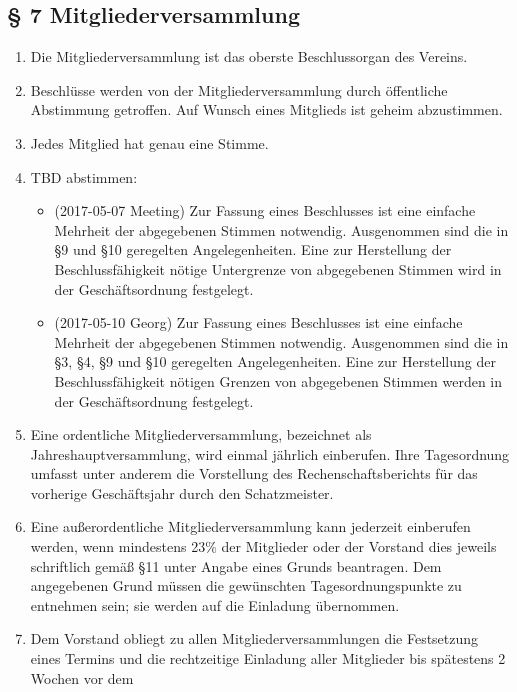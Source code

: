 ﻿\documentclass[10pt,a4paper]{scrartcl}
\begin{document}
\subsection*{§ 7 Mitgliederversammlung}
\begin{enumerate}

        \item Die Mitgliederversammlung ist das oberste Beschlussorgan des Vereins.
        \item Beschlüsse werden von der Mitgliederversammlung durch öffentliche Abstimmung getroffen.
                Auf Wunsch eines Mitglieds ist geheim abzustimmen.
        \item Jedes Mitglied hat genau eine Stimme.
		\item TBD abstimmen:
		    \begin{itemize}
				\item (2017-05-07 Meeting) Zur Fassung eines Beschlusses ist eine einfache Mehrheit der abgegebenen Stimmen
						notwendig. Ausgenommen sind die in §9 und §10 geregelten Angelegenheiten. Eine
						zur Herstellung der Beschlussfähigkeit nötige Untergrenze von abgegebenen Stimmen
						wird in der Geschäftsordnung festgelegt.
				\item (2017-05-10 Georg) Zur Fassung eines Beschlusses ist eine einfache Mehrheit der abgegebenen Stimmen
						notwendig. Ausgenommen sind die in §3, §4, §9 und §10 geregelten Angelegenheiten. Eine
						zur Herstellung der Beschlussfähigkeit nötigen Grenzen von abgegebenen Stimmen
						werden in der Geschäftsordnung festgelegt.
			\end{itemize}
        \item Eine ordentliche Mitgliederversammlung, bezeichnet als Jahreshauptversammlung,
                wird einmal jährlich einberufen. Ihre Tagesordnung umfasst unter anderem die
                Vorstellung des Rechenschaftsberichts für das vorherige Geschäftsjahr durch
                den Schatzmeister.
        \item Eine außerordentliche Mitgliederversammlung kann jederzeit einberufen werden, wenn
                mindestens 23\% der Mitglieder oder der Vorstand dies jeweils schriftlich gemäß §11
                unter Angabe eines Grunds beantragen. Dem angegebenen Grund müssen die gewünschten
                Tagesordnungspunkte zu entnehmen sein; sie werden auf die Einladung übernommen.
        \item Dem Vorstand obliegt zu allen Mitgliederversammlungen die Festsetzung eines Termins
                und die rechtzeitige Einladung aller Mitglieder bis spätestens 2 Wochen vor dem

\end{enumerate}
\end{document}
